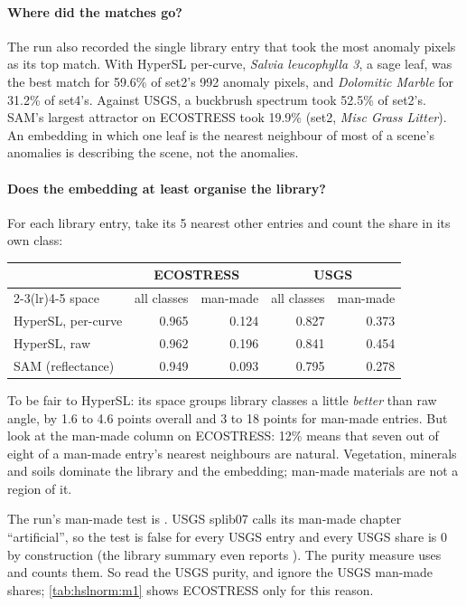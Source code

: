 \paragraph{Where did the matches go?} The run also recorded the single library entry that took the most anomaly pixels
as its top match. With HyperSL per-curve, \emph{Salvia leucophylla 3}, a sage leaf, was the best match for 59.6\% of set2's
992 anomaly pixels, and \emph{Dolomitic Marble} for 31.2\% of set4's. Against USGS, a buckbrush spectrum took 52.5\% of
set2's. SAM's largest attractor on ECOSTRESS took 19.9\% (set2, \emph{Misc Grass Litter}). An embedding in which one leaf is the nearest neighbour of most of a scene's anomalies is
describing the scene, not the anomalies.

\paragraph{Does the embedding at least organise the library?} For each library entry, take its 5 nearest other entries
and count the share in its own class:

\begin{center}\small
\begin{tabular}{@{}lrrrr@{}}
\toprule
& \multicolumn{2}{c}{ECOSTRESS} & \multicolumn{2}{c}{USGS} \\
\cmidrule(lr){2-3}\cmidrule(lr){4-5}
space & all classes & man-made & all classes & man-made \\
\midrule
HyperSL, per-curve & 0.965 & 0.124 & 0.827 & 0.373 \\
HyperSL, raw & 0.962 & 0.196 & 0.841 & 0.454 \\
SAM (reflectance) & 0.949 & 0.093 & 0.795 & 0.278 \\
\bottomrule
\end{tabular}
\end{center}
To be fair to HyperSL: its space groups library classes a little \emph{better} than raw angle, by 1.6 to 4.6 points
overall and 3 to 18 points for man-made entries. But look at the man-made
column on ECOSTRESS: 12\% means that seven out of eight of a man-made entry's nearest neighbours are natural. Vegetation,
minerals and soils dominate the library and the embedding; man-made materials are not a region of it.

\begin{sourcenote}
The run's man-made test is . USGS splib07 calls its man-made chapter ``artificial'', so the
test is false for every USGS entry and every USGS share is 0 by construction (the library summary even reports
). The purity measure uses  and counts them. So read the
USGS purity, and ignore the USGS man-made shares; \cref{tab:hslnorm:m1} shows ECOSTRESS only for this reason.
\end{sourcenote}

